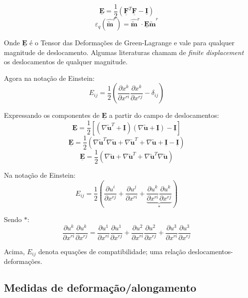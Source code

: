 	\[\underline{\mathbf{E}}=\frac{1}{2}(\underline{\mathbf{F}}^T\underline{\mathbf{F}}-\underline{\mathbf{I}})\]
	\[\varepsilon_q(\hat{\utilde{\mathbf{m}}}^r)=\hat{\utilde{\mathbf{m}}}^r\cdot\underline{\mathbf{E}}\hat{\utilde{\mathbf{m}}}^r\]
	
	Onde $\underline{\mathbf{E}}$ é o Tensor das Deformações de Green-Lagrange e vale para qualquer magnitude de deslocamento. Algumas literaturas chamam de \textit{finite displacement} os deslocamentos de qualquer magnitude.
	
	Agora na notação de Einstein:
	\[E_{ij}=\frac{1}{2}\left(\frac{\partial x^k}{\partial x^{ri}}\frac{\partial x^k}{\partial x^{rj}}-\delta_{ij}\right)\]
	
	Expressando os componentes de $\underline{\mathbf{E}}$ a partir do campo de deslocamentos:
	\[\underline{\mathbf{E}}=\frac{1}{2}[(\nabla\utilde{\mathbf{u}}^T+\underline{\mathbf{I}})(\nabla\utilde{\mathbf{u}}+\underline{\mathbf{I}})-\underline{\mathbf{I}}]\]
	\[\underline{\mathbf{E}}=\frac{1}{2}(\nabla\utilde{\mathbf{u}}^T\nabla\utilde{\mathbf{u}}+\nabla\utilde{\mathbf{u}}^T+\nabla\utilde{\mathbf{u}}+\underline{\mathbf{I}}-\underline{\mathbf{I}})\]
	\[\underline{\mathbf{E}}=\frac{1}{2}(\nabla\utilde{\mathbf{u}}+\nabla\utilde{\mathbf{u}}^T+\nabla\utilde{\mathbf{u}}^T\nabla\utilde{\mathbf{u}})\]
	
	Na notação de Einstein:
	\[E_{ij}=\frac{1}{2}\left(\frac{\partial u^i}{\partial x^{rj}}+\frac{\partial u^j}{\partial x^{ri}}+\underbrace{\frac{\partial u^k}{\partial x^{ri}}\frac{\partial u^k}{\partial x^{rj}}}_{*}\right)\]
	
	Sendo $*$:
	\[\frac{\partial u^k}{\partial x^{ri}}\frac{\partial u^k}{\partial x^{rj}}=\frac{\partial u^1}{\partial x^{ri}}\frac{\partial u^1}{\partial x^{rj}}+\frac{\partial u^2}{\partial x^{ri}}\frac{\partial u^2}{\partial x^{rj}}+\frac{\partial u^3}{\partial x^{ri}}\frac{\partial u^3}{\partial x^{rj}}\]
	
	Acima, $E_{ij}$ denota equações de compatibilidade; uma relação deslocamentos-deformações.
	
	\subsection{Medidas de deformação/alongamento}
	

